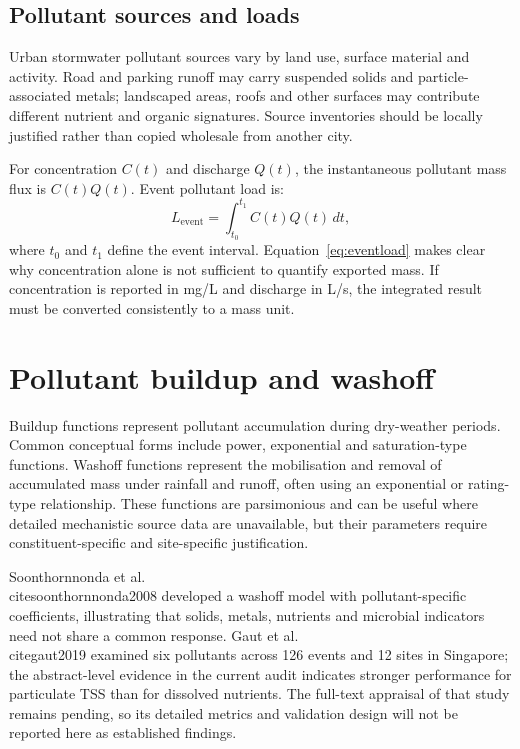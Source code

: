 \documentclass[journal]{IEEEtran}
\begin{document}
\subsection{Pollutant sources and loads}
Urban stormwater pollutant sources vary by land use, surface material and activity. Road and parking runoff may carry suspended solids and particle-associated metals; landscaped areas, roofs and other surfaces may contribute different nutrient and organic signatures. Source inventories should be locally justified rather than copied wholesale from another city.

For concentration $C(t)$ and discharge $Q(t)$, the instantaneous pollutant mass flux is $C(t)Q(t)$. Event pollutant load is:
\begin{equation}
  L_{\mathrm{event}} = \int_{t_0}^{t_1} C(t)Q(t)\,dt,
  \label{eq:eventload}
\end{equation}
where $t_0$ and $t_1$ define the event interval. Equation~\ref{eq:eventload} makes clear why concentration alone is not sufficient to quantify exported mass. If concentration is reported in \si{mg/L} and discharge in \si{L/s}, the integrated result must be converted consistently to a mass unit.

\section{Pollutant buildup and washoff}
Buildup functions represent pollutant accumulation during dry-weather periods. Common conceptual forms include power, exponential and saturation-type functions. Washoff functions represent the mobilisation and removal of accumulated mass under rainfall and runoff, often using an exponential or rating-type relationship. These functions are parsimonious and can be useful where detailed mechanistic source data are unavailable, but their parameters require constituent-specific and site-specific justification.

Soonthornnonda et al. \\cite{soonthornnonda2008} developed a washoff model with pollutant-specific coefficients, illustrating that solids, metals, nutrients and microbial indicators need not share a common response. Gaut et al. \\cite{gaut2019} examined six pollutants across 126 events and 12 sites in Singapore; the abstract-level evidence in the current audit indicates stronger performance for particulate TSS than for dissolved nutrients. The full-text appraisal of that study remains pending, so its detailed metrics and validation design will not be reported here as established findings.
\end{document}
